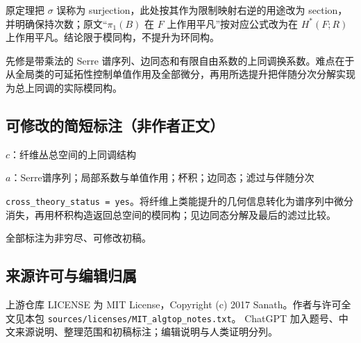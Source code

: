 \documentclass[UTF8,11pt]{ctexart}
\theoremstyle{definition}
\begin{document}
原定理把 $\sigma$ 误称为 surjection，此处按其作为限制映射右逆的用途改为 section，并明确保持次数；原文“$\pi_1(B)$ 在 $F$ 上作用平凡”按对应公式改为在 $H^*(F;R)$ 上作用平凡。结论限于模同构，不提升为环同构。

先修是带乘法的 Serre 谱序列、边同态和有限自由系数的上同调换系数。难点在于从全局类的可延拓性控制单值作用及全部微分，再用所选提升把伴随分次分解实现为总上同调的实际模同构。
\subsection*{可修改的简短标注（非作者正文）}
$c$：纤维丛总空间的上同调结构

$a$：Serre谱序列；局部系数与单值作用；杯积；边同态；滤过与伴随分次

\texttt{cross\_theory\_status = yes}。将纤维上类能提升的几何信息转化为谱序列中微分消失，再用杯积构造返回总空间的模同构；见边同态分解及最后的滤过比较。

全部标注为非穷尽、可修改初稿。
\subsection*{来源许可与编辑归属}
上游仓库 LICENSE 为 MIT License，Copyright (c) 2017 Sanath。作者与许可全文见本包 \nolinkurl{sources/licenses/MIT_algtop_notes.txt}。
ChatGPT 加入题号、中文来源说明、整理范围和初稿标注；编辑说明与人类证明分列。
\end{document}

